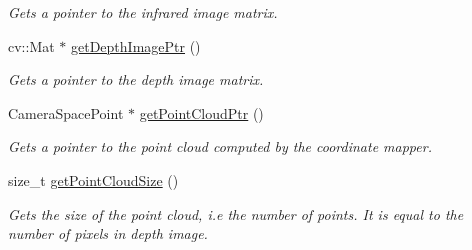 \begin{DoxyCompactItemize}
\begin{DoxyCompactList}\small\item\em Gets a pointer to the infrared image matrix. \end{DoxyCompactList}\item 
\hypertarget{classpersonal_robotics_1_1_kinect_reader_ae794fee5a9061c16d40237481f9ed913}{}cv\+::\+Mat $\ast$ \hyperlink{classpersonal_robotics_1_1_kinect_reader_ae794fee5a9061c16d40237481f9ed913}{get\+Depth\+Image\+Ptr} ()\label{classpersonal_robotics_1_1_kinect_reader_ae794fee5a9061c16d40237481f9ed913}

\begin{DoxyCompactList}\small\item\em Gets a pointer to the depth image matrix. \end{DoxyCompactList}\item 
\hypertarget{classpersonal_robotics_1_1_kinect_reader_a92e2afe02efab759262e4638991c285f}{}Camera\+Space\+Point $\ast$ \hyperlink{classpersonal_robotics_1_1_kinect_reader_a92e2afe02efab759262e4638991c285f}{get\+Point\+Cloud\+Ptr} ()\label{classpersonal_robotics_1_1_kinect_reader_a92e2afe02efab759262e4638991c285f}

\begin{DoxyCompactList}\small\item\em Gets a pointer to the point cloud computed by the coordinate mapper. \end{DoxyCompactList}\item 
\hypertarget{classpersonal_robotics_1_1_kinect_reader_aa3490e36da08c2f89908706a76a6508f}{}size\+\_\+t \hyperlink{classpersonal_robotics_1_1_kinect_reader_aa3490e36da08c2f89908706a76a6508f}{get\+Point\+Cloud\+Size} ()\label{classpersonal_robotics_1_1_kinect_reader_aa3490e36da08c2f89908706a76a6508f}

\begin{DoxyCompactList}\small\item\em Gets the size of the point cloud, i.\+e the number of points. It is equal to the number of pixels in depth image. \end{DoxyCompactList}\end{DoxyCompactItemize}

